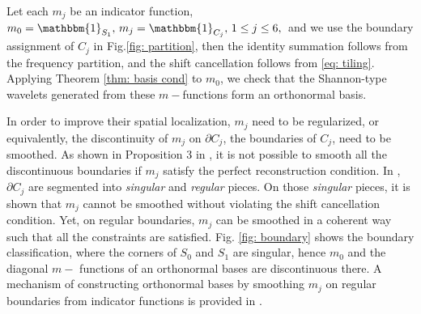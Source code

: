 Let each $m_j$ be an indicator function, $m_0 = \mathbbm{1}_{S_1},\, m_j = \mathbbm{1}_{C_j},\,1\leq j \leq 6,\,$ and we use the boundary assignment of $C_j$ in Fig.\ref{fig: partition},
then the identity summation follows from the frequency partition, and the shift cancellation follows from \eqref{eq: tiling}.%
Applying Theorem \ref{thm: basis cond} to $m_0$, we check that the Shannon-type wavelets generated from these $m-$functions form an orthonormal basis.

In order to improve their spatial localization, $m_j$ need to be regularized, or equivalently, the discontinuity of $m_j$ on $\partial C_j$, the boundaries of $C_j$, need to be smoothed. 
As shown in Proposition 3 in \cite{durand2007}, it is not possible to smooth all the discontinuous boundaries if $m_j$ satisfy the perfect reconstruction condition.
In \cite{yin2014orthshear}, $\partial C_j$ are segmented into {\it singular} and {\it regular} pieces. On those {\it singular} pieces, it is shown that $m_j$ cannot be smoothed without violating the shift cancellation condition. Yet, on regular boundaries, $m_j$ can be smoothed in a coherent way such that all the constraints are satisfied. Fig. \ref{fig: boundary} shows the boundary classification, where the corners of $S_0$ and $S_1$ are singular, hence $m_0$ and the diagonal $m-$ functions of an orthonormal bases are discontinuous there. A mechanism of constructing orthonormal bases by smoothing $m_j$ on regular boundaries from indicator functions is provided in \cite{yin2014orthshear}.%


